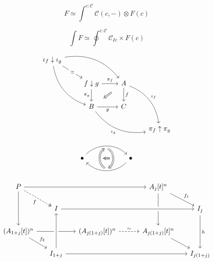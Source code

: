 \documentclass[12pt]{article}
\begin{document}
$$F \simeq \int^{c: \mathcal{C}} \mathcal{C}(c, -) \otimes F(c)$$

$$\int F \simeq \oint^{c: \mathcal{C}} \mathcal{C}_{\sslash c} \times F(c)$$

\begin{equation*}
  \begin{tikzcd}
\iota_f \downarrow \iota_{g} \ar[dr, "\simeq" description] \ar[ddr, bend right] \ar[drr, bend left] & & & \\    
& f \downarrow g \ar[r, "\pi_f"] \ar[d, "\pi_{g}"'] & A \ar[d, "f"] \ar[rdd, "\iota_f", bend left] \ar[Rightarrow, from=2-3, to=3-2, shorten=4mm] & \\ & B \ar[r, "g"'] \ar[drr, "\iota_{g}"', bend right]  & C & \\ & & & \pi_f \uparrow \pi_{g}
\end{tikzcd}
\end{equation*}

\begin{equation*}
  \tikzset{Rightarrow/.style={double equal sign distance,>={Implies},->},
triple/.style={-,preaction={draw,Rightarrow}},
quadruple/.style={preaction={draw,Rightarrow,shorten >=0pt},shorten >=1pt,-,double,double
distance=0.2pt}}
  \begin{tikzcd}[column sep=2cm]
    \bullet \ar[r, bend left=45, ""{name=A, below}] & \bullet \ar[l, bend left=45, ""{name=B, above}] \ar[Rightarrow, from=A, to=B, bend left=60, ""{name=C, left}] \ar[Rightarrow, from=B, to=A, bend left=60, ""{name=D, right}] \ar[triple, from=C, to=D]
  \end{tikzcd}
\end{equation*}

    \[
   \begin{tikzcd}[row sep=1.5em, column sep = 1.5em]
   P \arrow[rrrr] \arrow[dr,dashed, swap,"f", two heads] \arrow[dd,swap] &&&&
   A_j[t]^n \arrow[dd] \arrow[dr,"f_1"] \\
   & I \arrow[rrrr, crossing over] &&&&
   I_j \arrow[dd,"h"] \\
   (A_{1+j}[t])^n \arrow[rr] \arrow[dr, "f_2"] && (A_{j(1+j)}[t])^n        
   \arrow[rr,"\sim", dashed ] && A_{j(1+j)}[t]^n \arrow[dr] \\
   & I_{1+j} \arrow[rrrr] \arrow[uu, crossing over]&&& &I_{j(1+j)}
  \end{tikzcd}
\] 
\end{document}
